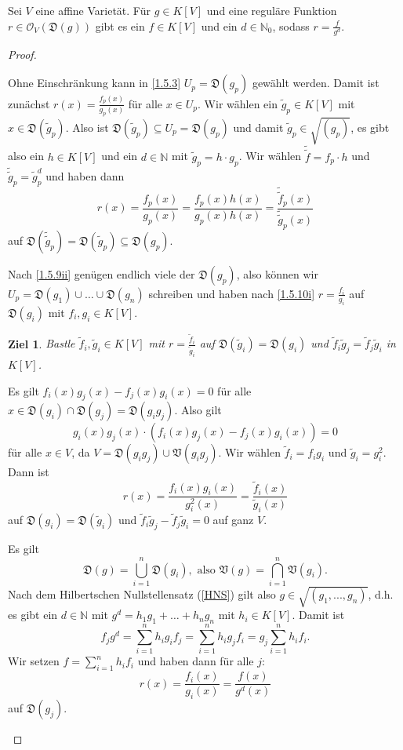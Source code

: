 \documentclass[a4paper,12pt]{scrbook}
\theoremstyle{keinenummern} %
\newtheorem{ziel}{Ziel}
\theoremstyle{mitnummern}
\theoremstyle{unserbeweis}
\newtheorem{proof}{Beweis}
\def\V{\mathfrak{V}}
\def\O{\mathcal{O}}
\newcommand{\D}{\mathfrak{D}}
\renewcommand{\dotsc}{\ensuremath{\!...}}
\newcommand{\set}[1]{\ensuremath{\mathbb{#1}}}
\newcommand{\N}{\set{N}}
\begin{document}
\begin{prop}\label{1.5.10}
  Sei $V$ eine affine Varietät. Für $g\in K[V]$ und eine reguläre Funktion $r\in\O_V(\D(g))$ gibt es ein $f\in K[V]$ und ein
  $d\in\N_0$, sodass $r=\frac{f}{g^d}$.
\end{prop}
\begin{proof}
  \begin{prooflist}
  \item{} Ohne Einschränkung kann in \cref{1.5.3} $U_p=\D(g_p)$ gewählt werden. Damit ist zunächst
    $r(x)=\frac{f_p(x)}{g_p(x)}$ für alle $x\in U_p$. Wir wählen ein $\tilde{g}_p\in K[V]$ mit $x\in \D(\tilde{g}_p)$. Also ist
    $\D(\tilde{g}_p)\subseteq U_p=\D(g_p)$ und damit $\tilde{g}_p\in\sqrt{(g_p)}$, es gibt also ein $h\in K[V]$ und ein $d\in\N$
    mit $\tilde{g}_p=h\cdot g_p$. Wir wählen $\tilde{\tilde{f}}=f_p\cdot h$ und $\tilde{\tilde{g}}_p=\tilde{g}_p^d$ und haben
    dann \[r(x)=\frac{f_p(x)}{g_p(x)} = \frac{f_p(x)h(x)}{g_p(x)h(x)} = \frac{\tilde{\tilde{f}}_p(x)}{\tilde{\tilde{g}}_p(x)}\]
    auf $\D(\tilde{\tilde{g}}_p)=\D(\tilde{g}_p)\subseteq \D(g_p)$.
  \item Nach \cref{1.5.9ii} genügen endlich viele der $\D(g_p)$, also können wir $U_p=\D(g_1)\cup\dotso\cup
    \D(g_n)$ schreiben und haben nach \ref{1.5.10i} $r=\frac{f_i}{g_i}$ auf $\D(g_i)$ mit $f_i,g_i\in K[V]$.
    \begin{ziel}
      Bastle $\tilde{f}_i,\tilde{g}_i\in K[V]$ mit $\displaystyle r=\frac{\tilde{f}_i}{\tilde{g}_i}$ auf $\D(\tilde{g}_i)=\D(g_i)$ und
      $\tilde{f}_i\tilde{g}_j=\tilde{f}_j\tilde{g}_i$ in $K[V]$.
    \end{ziel}
    Es gilt $f_i(x)g_j(x)-f_j(x)g_i(x)=0$ für alle $x\in \D(g_i)\cap \D(g_j)=\D(g_ig_j)$. Also gilt
    \[g_i(x)g_j(x)\cdot(f_i(x)g_j(x)-f_j(x)g_i(x))=0\] für alle $x\in V$, da $V=\D(g_ig_j)\cup\V(g_ig_j)$. Wir wählen
    $\tilde{f}_i=f_ig_i$ und $\tilde{g}_i=g_i^2$. Dann ist \[r(x)=\frac{f_i(x)g_i(x)}{g_i^2(x)} =
    \frac{\tilde{f}_i(x)}{\tilde{g}_i(x)}\] auf $\D(g_i)=\D(\tilde{g}_i)$ und $\tilde{f}_i\tilde{g}_j-\tilde{f}_j\tilde{g}_i=0$ auf
    ganz $V$.

    Es gilt \[\D(g)=\bigcup_{i=1}^n \D(g_i),\text{ also }\V(g)=\bigcap_{i=1}^n\V(g_i).\] Nach dem Hilbertschen Nullstellensatz
    (\cref{HNS}) gilt also $g\in\sqrt{(g_1,\dotsc,g_n)}$, d.h. es gibt ein $d\in\N$ mit $g^d=h_1g_1+\dotso+h_ng_n$ mit
    $h_i\in K[V]$. Damit ist
    \[ f_jg^d = \sum_{i=1}^nh_ig_if_j = \sum_{i=1}^n h_ig_jf_i = g_j\sum_{i=1}^nh_if_i. \]
    Wir setzen $f=\displaystyle\sum_{i=1}^nh_if_i$ und haben dann für alle $j$: \[r(x)=\frac{f_i(x)}{g_i(x)}=\frac{f(x)}{g^d(x)}\]
    auf $\D(g_j)$.
  \end{prooflist}
\end{proof}
\end{document}
